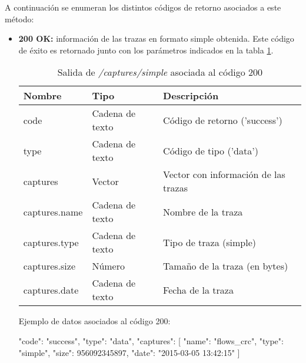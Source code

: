 A continuación se enumeran los distintos códigos de retorno asociados a este método:
\begin{itemize}

\item{\textbf{200 OK:} información de las \glspl{traza} en formato \gls{simple} obtenida. Este código de éxito es retornado junto con los parámetros indicados en la tabla \ref{extra:api:capturessimple:ok}.
\begin{table}[H]
\centering
\begin{tabular}{|l|l|l|}
\hline
\rowcolor[HTML]{F5F5F5}
\textbf{Nombre}                & \textbf{Tipo}   & \textbf{Descripción}                            \\ \hline
code                           & Cadena de texto & Código de retorno ('success')                   \\ \hline
type                           & Cadena de texto & Código de tipo ('data')                         \\ \hline
captures                       & Vector          & Vector con información de las \glspl{traza}     \\ \hline
captures.name                  & Cadena de texto & Nombre de la \gls{traza}                        \\ \hline
captures.type                  & Cadena de texto & Tipo de \gls{traza} (\gls{simple})              \\ \hline
captures.size                  & Número          & Tamaño de la \gls{traza} (en bytes)             \\ \hline
captures.date                  & Cadena de texto & Fecha de la \gls{traza}                         \\ \hline
\end{tabular}
\caption{Salida de \textit{/captures/simple} asociada al código 200}
\label{extra:api:capturessimple:ok}
\end{table}
\begin{minipage}{\textwidth}
Ejemplo de datos asociados al código 200:

\begin{code}[language=json]
{
  "code": "success",
  "type": "data",
  "captures": [
    {
      "name": "flows_crc",
      "type": "simple",
      "size": 956092345897,
      "date": "2015-03-05 13:42:15"
    }
  ]
}
\end{code}
\end{minipage}
}

\end{itemize}

